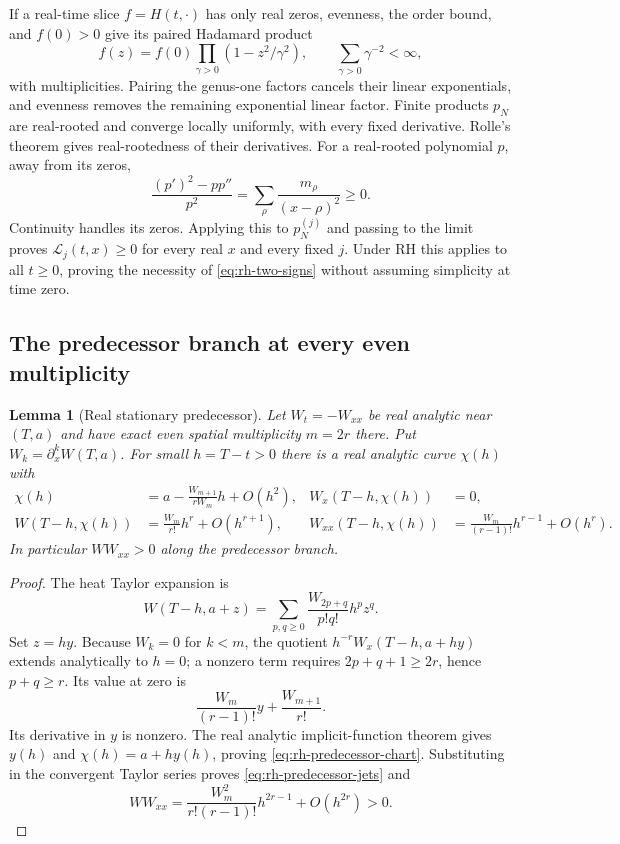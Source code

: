 \documentclass[11pt]{article}
\numberwithin{equation}{section}
\newtheorem{lemma}[theorem]{Lemma}
\theoremstyle{definition}
\theoremstyle{remark}
\begin{document}
If a real-time slice $f=H(t,\cdot)$ has only real zeros, evenness, the
order bound, and $f(0)>0$ give its paired Hadamard product
\begin{equation}
 f(z)=f(0)\prod_{\gamma>0}(1-z^2/\gamma^2),\qquad
 \sum_{\gamma>0}\gamma^{-2}<\infty,
 \label{eq:rh-paired-product}
\end{equation}
with multiplicities.  Pairing the genus-one factors cancels their linear
exponentials, and evenness removes the remaining exponential linear
factor.  Finite products $p_N$ are real-rooted and converge locally
uniformly, with every fixed derivative.  Rolle's theorem gives
real-rootedness of their derivatives.  For a real-rooted polynomial $p$,
away from its zeros,
\[
 \frac{(p')^2-pp''}{p^2}
 =\sum_\rho\frac{m_\rho}{(x-\rho)^2}\ge0.
\]
Continuity handles its zeros.  Applying this to $p_N^{(j)}$ and passing
to the limit proves $\mathscr L_j(t,x)\ge0$ for every real $x$ and
every fixed $j$.  Under RH this applies to all $t\ge0$, proving the
necessity of \eqref{eq:rh-two-signs} without assuming simplicity at time zero.

\subsection{The predecessor branch at every even multiplicity}

\begin{lemma}[Real stationary predecessor]\label{lem:rh-predecessor}
Let $W_t=-W_{xx}$ be real analytic near $(T,a)$ and have exact even
spatial multiplicity $m=2r$ there.  Put $W_k=\partial_x^kW(T,a)$.
For small $h=T-t>0$ there is a real analytic curve $\chi(h)$ with
\begin{align}
 \chi(h)&=a-\frac{W_{m+1}}{rW_m}h+O(h^2),
 &W_x(T-h,\chi(h))&=0,\label{eq:rh-predecessor-chart}\\
 W(T-h,\chi(h))&=\frac{W_m}{r!}h^r+O(h^{r+1}),
 &W_{xx}(T-h,\chi(h))&=\frac{W_m}{(r-1)!}h^{r-1}+O(h^r).
 \label{eq:rh-predecessor-jets}
\end{align}
In particular $WW_{xx}>0$ along the predecessor branch.
\end{lemma}
\begin{proof}
The heat Taylor expansion is
\[
 W(T-h,a+z)=\sum_{p,q\ge0}\frac{W_{2p+q}}{p!q!}h^pz^q.
\]
Set $z=hy$.  Because $W_k=0$ for $k<m$, the quotient
$h^{-r}W_x(T-h,a+hy)$ extends analytically to $h=0$; a nonzero
term requires $2p+q+1\ge2r$, hence $p+q\ge r$.  Its value at zero is
\[
 \frac{W_m}{(r-1)!}y+\frac{W_{m+1}}{r!}.
\]
Its derivative in $y$ is nonzero.  The real analytic implicit-function
theorem gives $y(h)$ and $\chi(h)=a+hy(h)$, proving
\eqref{eq:rh-predecessor-chart}.  Substituting in the convergent Taylor
series proves \eqref{eq:rh-predecessor-jets} and
\[
 WW_{xx}=\frac{W_m^2}{r!(r-1)!}h^{2r-1}+O(h^{2r})>0.
\]
\end{proof}
\end{document}
